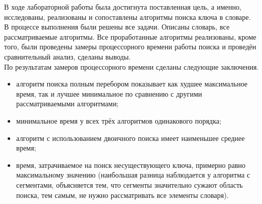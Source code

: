 В ходе лабораторной работы была достигнута поставленная цель, а именно, исследованы, реализованы и сопоставлены алгоритмы поиска ключа в словаре.\\

В процессе выполнения были решены все задачи. Описаны словарь, все рассматриваемые алгоритмы. Все проработанные алгоритмы реализованы, кроме того, были проведены замеры процессорного времени работы поиска и проведён сравнительный анализ, сделаны выводы.\\

По результатам замеров процессорного времени сделаны следующие заключения.
\begin{itemize}
	\item алгоритм поиска полным перебором показывает как худшее максимальное время, так и лучшее минимальное по сравнению с другими рассматриваемыми алгоритмами;
	\item минимальное время у всех трёх алгоритмов одинакового порядка;
	\item алгоритм с использованием двоичного поиска имеет наименьшее среднее время;
	\item время, затрачиваемое на поиск несуществующего ключа, примерно равно максимальному значению (наибольшая разница наблюдается у алгоритма с сегментами, объясняется тем, что сегменты значительно сужают область поиска, тем самым, не нужно рассматривать все элементы словаря).
\end{itemize}